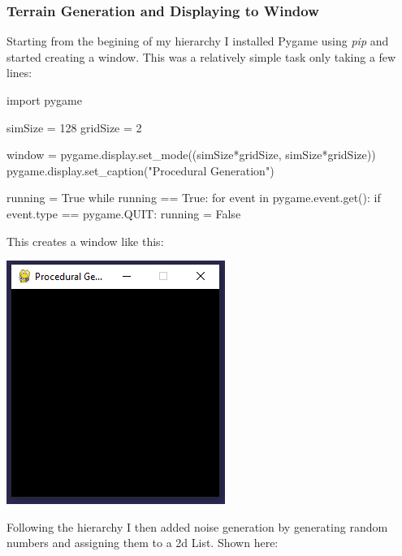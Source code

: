 \begin{flushleft}
            \subsubsection{Terrain Generation and Displaying to Window}
            Starting from the begining of my hierarchy I installed Pygame using \textit{pip} and started creating a window.
            This was a relatively simple task only taking a few lines:
            \vspace{0.5cm}

            \normalsize
            \begin{pythoncode}
import pygame

simSize = 128
gridSize = 2

window = pygame.display.set_mode((simSize*gridSize, simSize*gridSize))
pygame.display.set_caption("Procedural Generation")

running = True
while running == True:
  for event in pygame.event.get():
    if event.type == pygame.QUIT:
      running = False
            \end{pythoncode}

            \vspace{0.5cm}

            \large
            This creates a window like this: \\ 
            \vspace{0.5cm}
            \centerline{\includegraphics{Images/Prototype/CreateWindowExample.PNG}}

            \vspace{0.5cm}

            Following the hierarchy I then added noise generation by generating random numbers and 
            assigning them to a 2d List. Shown here: 
            

\end{flushleft}
